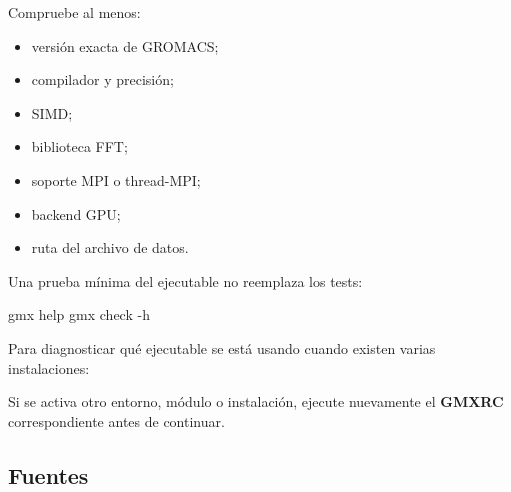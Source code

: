 \documentclass[
  spanish,
  11pt,
  a4paper]{article}
\newenvironment{Shaded}{\begin{snugshade}}{\end{snugshade}}
\newcommand{\AttributeTok}[1]{\textcolor[rgb]{0.13,0.29,0.53}{#1}}
\newcommand{\BuiltInTok}[1]{#1}
\newcommand{\ExtensionTok}[1]{#1}
\newcommand{\NormalTok}[1]{#1}
\newcommand{\StringTok}[1]{\textcolor[rgb]{0.31,0.60,0.02}{#1}}
\newcommand{\VariableTok}[1]{\textcolor[rgb]{0.00,0.00,0.00}{#1}}
\providecommand{\tightlist}{%
  \setlength{\itemsep}{0pt}\setlength{\parskip}{0pt}}
\begin{document}
Compruebe al menos:

\begin{itemize}
\tightlist
\item
  versión exacta de GROMACS;
\item
  compilador y precisión;
\item
  SIMD;
\item
  biblioteca FFT;
\item
  soporte MPI o thread-MPI;
\item
  backend GPU;
\item
  ruta del archivo de datos.
\end{itemize}

Una prueba mínima del ejecutable no reemplaza los tests:

\begin{Shaded}
\begin{Highlighting}[]
\ExtensionTok{gmx}\NormalTok{ help}
\ExtensionTok{gmx}\NormalTok{ check }\AttributeTok{{-}h}
\end{Highlighting}
\end{Shaded}

Para diagnosticar qué ejecutable se está usando cuando existen varias
instalaciones:

\begin{Shaded}
\end{Shaded}

Si se activa otro entorno, módulo o instalación, ejecute nuevamente el
\textbf{GMXRC} correspondiente antes de continuar.

\subsection{Fuentes}\label{fuentes}
\end{document}
